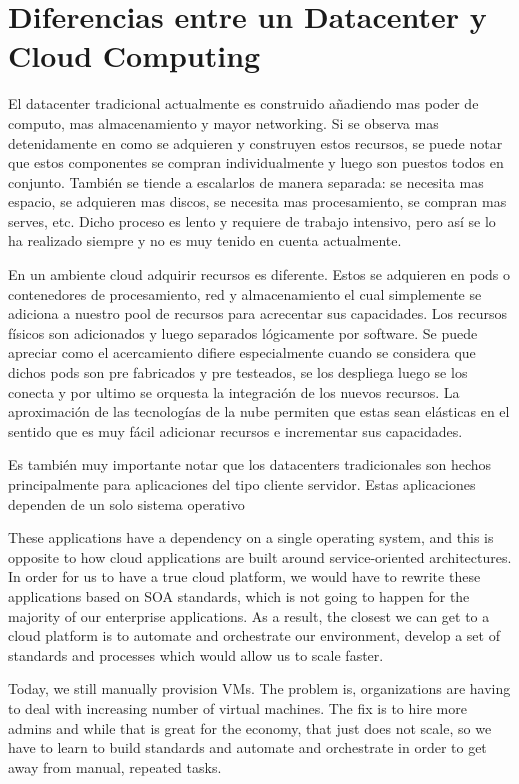 \documentclass[12pt,a4paper]{article}
\begin{document}
\section{Diferencias entre un Datacenter y Cloud Computing}
El datacenter tradicional actualmente es construido añadiendo mas poder de computo, mas almacenamiento
y mayor networking. Si se observa mas detenidamente en como se adquieren y construyen estos recursos, se puede
notar que estos componentes se compran individualmente y luego son puestos todos en conjunto. También se tiende
a escalarlos de manera separada: se necesita mas espacio, se adquieren mas discos, se necesita mas 
procesamiento, se compran mas serves, etc. Dicho proceso es lento y requiere de trabajo intensivo, pero así se 
lo ha realizado siempre y no es muy tenido en cuenta actualmente.

En un ambiente cloud adquirir recursos es diferente. Estos se adquieren en pods o contenedores de 
procesamiento, red y almacenamiento el cual simplemente se adiciona a nuestro pool de recursos para acrecentar 
sus capacidades. Los recursos físicos son adicionados y luego separados lógicamente por software. Se puede 
apreciar como el acercamiento difiere especialmente cuando se considera que dichos pods son pre fabricados y 
pre testeados, se los despliega luego se los conecta y por ultimo se orquesta la integración de los nuevos
recursos. La aproximación de las tecnologías de la nube permiten que estas sean elásticas en el sentido que es
muy fácil adicionar recursos e incrementar sus capacidades.

Es también muy importante notar que los datacenters tradicionales son hechos principalmente para aplicaciones
del tipo cliente servidor. Estas aplicaciones dependen de un solo sistema operativo 

 These applications have a dependency on a single operating system, and this is opposite to how 
cloud applications are built around service-oriented architectures. In order for us to have a true cloud 
platform, we would have to rewrite these applications based on SOA standards, which is not going to happen for 
the majority of our enterprise applications. As a result, the closest we can get to a cloud platform is to 
automate and orchestrate our environment, develop a set of standards and processes which would allow us to 
scale faster.

Today, we still manually provision VMs. The problem is, organizations are having to deal with increasing number 
of virtual machines. The fix is to hire more admins and while that is great for the economy, that just does not 
scale, so we have to learn to build standards and automate and orchestrate in order to get away from manual, 
repeated tasks.
\end{document}
